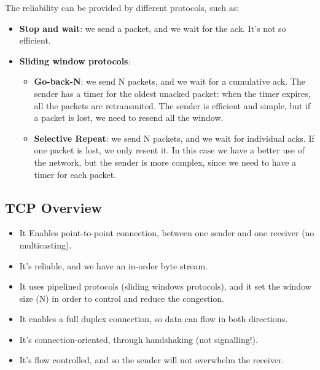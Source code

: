 The reliability can be provided by different protocols, such as:
\begin{itemize}
    \item \textbf{Stop and wait}: we send a packet, and we wait for the ack. It's not so efficient.
    \item \textbf{Sliding window protocols}:\begin{itemize}
        \item \textbf{Go-back-N}: we send N packets, and we wait for a cumulative ack. The sender has a timer for the oldest unacked packet: when the timer expires, all the packets are retransmited. The sender is efficient and simple, but if a packet is lost, we need to resend all the window.
        \item \textbf{Selective Repeat}: we send N packets, and we wait for individual acks. If one packet is lost, we only resent it. In this case we have a better use of the network, but the sender is more complex, since we need to have a timer for each packet.
    \end{itemize}
    
\end{itemize}

\subsection{TCP Overview}
\begin{itemize}
    \item It Enables point-to-point connection, between one sender and one receiver (no multicasting).
    \item It's reliable, and we have an in-order byte stream.
    \item It uses pipelined protocols (sliding windows protocols), and it set the window size (N) in order to control and reduce the congestion.
    \item It enables a full duplex connection, so data can flow in both directions.
    \item It's connection-oriented, through handshaking (not signalling!).
    \item It's flow controlled, and so the sender will not overwhelm the receiver.
\end{itemize}